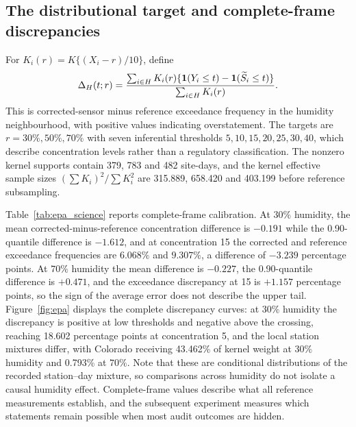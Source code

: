 \subsection{The distributional target and complete-frame discrepancies}
For $K_i(r)=K\{(X_i-r)/10\}$, define
\begin{equation}\label{eq:epatarget}
 \Delta_H(t;r)=\frac{\sum_{i\in H}K_i(r)
       \{\mathbf 1(Y_i\leq t)-\mathbf 1(\widetilde S_i\leq t)\}}
       {\sum_{i\in H}K_i(r)}.
\end{equation}
This is corrected-sensor minus reference exceedance frequency in the humidity neighbourhood, with positive values indicating overstatement. The targets are $r=30\%,50\%,70\%$ with seven inferential thresholds $5,10,15,20,25,30,40$, which describe concentration levels rather than a regulatory classification. The nonzero kernel supports contain 379, 783 and 482 site-days, and the kernel effective sample sizes $(\sum K_i)^2/\sum K_i^2$ are 315.889, 658.420 and 403.199 before reference subsampling.

Table~\ref{tab:epa_science} reports complete-frame calibration. At $30\%$ humidity, the mean corrected-minus-reference concentration difference is $-0.191$ while the 0.90-quantile difference is $-1.612$, and at concentration 15 the corrected and reference exceedance frequencies are $6.068\%$ and $9.307\%$, a difference of $-3.239$ percentage points. At $70\%$ humidity the mean difference is $-0.227$, the 0.90-quantile difference is $+0.471$, and the exceedance discrepancy at 15 is $+1.157$ percentage points, so the sign of the average error does not describe the upper tail. Figure~\ref{fig:epa} displays the complete discrepancy curves: at $30\%$ humidity the discrepancy is positive at low thresholds and negative above the crossing, reaching 18.602 percentage points at concentration 5, and the local station mixtures differ, with Colorado receiving 43.462\% of kernel weight at $30\%$ humidity and 0.793\% at $70\%$. Note that these are conditional distributions of the recorded station--day mixture, so comparisons across humidity do not isolate a causal humidity effect. Complete-frame values describe what all reference measurements establish, and the subsequent experiment measures which statements remain possible when most audit outcomes are hidden.



